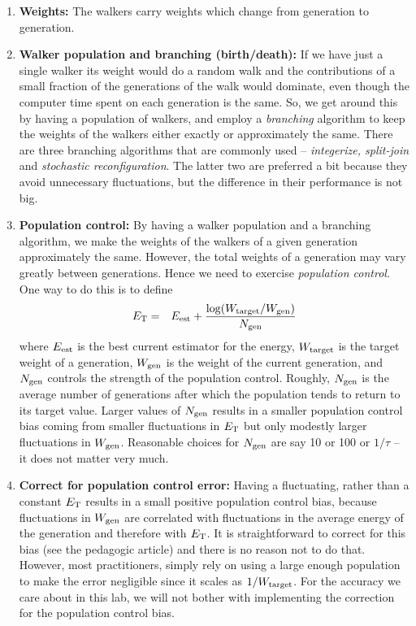 \documentclass[11pt,aps,prb,amsmath,amssymb,superscriptaddress,notitlepage]{revtex4-1}
\def\beq{\begin{eqnarray}}
\def\eeq{\end{eqnarray}}
\begin{document}
\begin{enumerate}
\item {\bf Weights:} The walkers carry weights which change from generation to generation.

\item {\bf Walker population and branching (birth/death):} If we have just a single walker its weight
would do a random walk and the contributions of a small fraction of the generations of the walk would dominate, even though the
computer time spent on each generation is the same.  So, we get around this by having a population
of walkers, and employ a {\it branching} algorithm to keep the weights of the walkers either exactly or approximately
the same.  There are three branching algorithms that are commonly used -- {\it integerize, split-join}
and {\it stochastic reconfiguration}.  The latter two are preferred a bit because they avoid unnecessary
fluctuations, but the difference in their performance is not big.

\item {\bf Population control:} By having a walker population and a branching algorithm, we make the weights
of the walkers of a given generation approximately the same.  However, the total weights of a generation may
vary greatly between generations.  Hence we need to exercise {\it population control}.
One way to do this is to define
\beq
\ET &=& \Eest + {\log(W_{\rm target}/W_{\rm gen}) \over N_{\rm gen}}
\label{popcontrol}
\eeq
where $E_{\rm est}$ is the best current estimator for the energy, $W_{\rm target}$ is the target weight of a generation,
$W_{\rm gen}$ is the weight of the current generation, and $N_{\rm gen}$ controls the strength of the population
control.  Roughly, $N_{\rm gen}$ is the average number of generations after which the population tends to
return to its target value.
Larger values of $N_{\rm gen}$ results in a smaller population control bias coming from smaller fluctuations in $E_{\rm T}$ but only modestly larger fluctuations in $W_{\rm gen}$.
Reasonable choices for $N_{\rm gen}$ are say 10 or 100 or $1/\tau$ -- it does not matter very much. 

\item {\bf Correct for population control error:}  Having a fluctuating, rather than a constant $E_{\rm T}$ results
in a small positive population control bias, because fluctuations in $W_{\rm gen}$ are correlated with fluctuations
in the average energy of the generation and therefore with $E_{\rm T}$.  It is straightforward to correct for this bias (see the pedagogic article)
and there is no reason not to do that.
However, most practitioners, simply rely on using a large enough population to make the error negligible
since it scales as $1/W_{\rm target}$.  For the accuracy we care about in this lab, we will not bother with
implementing the correction for the population control bias.
\end{enumerate}
\end{document}
